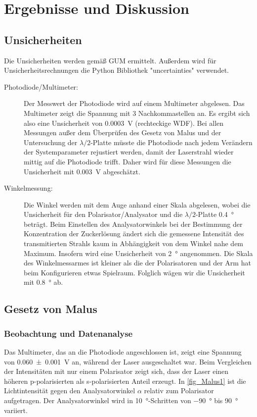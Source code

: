 \documentclass[
	a4paper,
	12pt,
	pagesize,
	ngerman
]{scrartcl}
\begin{document}
	\section{Ergebnisse und Diskussion}
	
	\subsection{Unsicherheiten} %
	Die Unsicherheiten werden gemäß GUM ermittelt. 
	Außerdem wird für Unsicherheitsrechnungen die Python Bibliothek "uncertainties" verwendet.
	\begin{description}
		\item[Photodiode/Multimeter:] Der Messwert der Photodiode wird auf einem Multimeter abgelesen. 
			Das Multimeter zeigt die Spannung mit 3 Nachkommastellen an. 
			Es ergibt sich also eine Unsicherheit von \SI{0,0003}{V} (rechteckige WDF).
			Bei allen Messungen außer dem Überprüfen des Gesetz von Malus und der Untersuchung der $\lambda/2$-Platte müsste die Photodiode nach jedem Verändern der Systemparameter rejustiert werden, damit der Laserstrahl wieder mittig auf die Photodiode trifft. 
			Daher wird für diese Messungen die Unsicherheit mit \SI{0,003}{V} abgeschätzt. %
		\item[Winkelmessung:]  Die Winkel werden mit dem Auge anhand einer Skala abgelesen, wobei die Unsicherheit für den Polarisator/Analysator und die $\lambda/2$-Platte \SI{0,4}{\degree} beträgt. 
			Beim Einstellen des Analysatorwinkels bei der Bestimmung der Konzentration der Zuckerlösung ändert sich die gemessene Intensität des transmitierten Strahls kaum in Abhängigkeit von dem Winkel nahe dem Maximum. 
			Insofern wird eine Unsicherheit von \SI{2}{\degree} angenommen.
			Die Skala des Winkelmessarmes ist kleiner als die der Polarisatoren und der Arm hat beim Konfigurieren etwas Spielraum. 
			Folglich wägen wir die Unsicherheit mit \SI{0,8}{\degree} ab.
	\end{description} 

	\subsection{Gesetz von Malus}
	\subsubsection{Beobachtung und Datenanalyse}
	Das Multimeter, das an die Photodiode angeschlossen ist, zeigt eine Spannung von \SI{0,060+-0,001}{V} an, während der Laser ausgeschaltet war.
	Beim Vergleichen der Intensitäten mit nur einem Polarisator zeigt sich, dass der Laser einen höheren p-polarisierten als s-polarisierten Anteil erzeugt.
	In \cref{fig_Malus1} ist die Lichtintensität gegen den Analysatorwinkel $\alpha$ relativ zum Polarisator aufgetragen.
	Der Analysatorwinkel wird in \SI{10}{\degree}-Schritten von \SI{-90}{\degree} bis \SI{90}{\degree} variiert.
\end{document}
